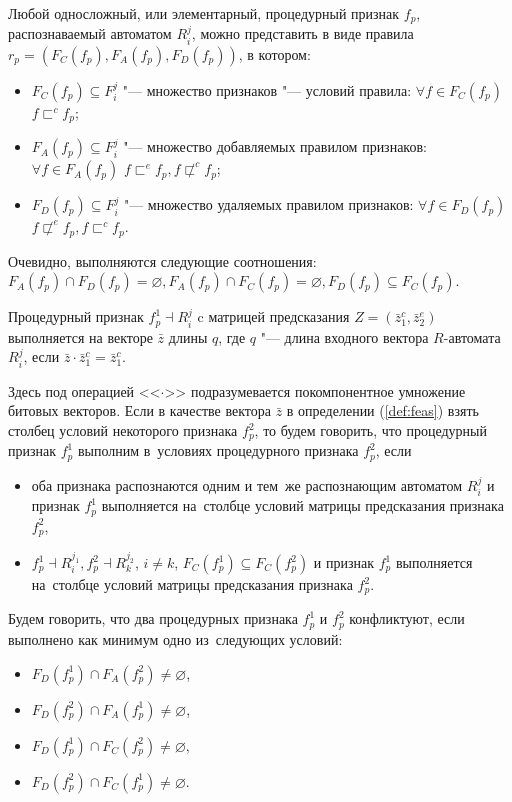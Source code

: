 Любой односложный, или элементарный, процедурный признак $f_p$, распознаваемый автоматом $R_i^j$, можно представить в виде правила $r_p=(F_C(f_p),F_A(f_p),F_D(f_p))$, в котором:
\begin{itemize}
	\item $F_C (f_p )\subseteq F_i^j$ "--- множество признаков "--- условий правила: $\forall f\in F_C(f_p)$ $f\sqsubset^c f_p$;
	\item $F_A(f_p)\subseteq F_i^j$ "--- множество добавляемых правилом признаков: $\forall f\in F_A(f_p)$ $f\sqsubset^e f_p,f\not\sqsubset^c f_p$;
	\item $F_D(f_p)\subseteq F_i^j$ "--- множество удаляемых правилом признаков: $\forall f\in F_D(f_p)$ $f\not\sqsubset^e f_p,f\sqsubset^c f_p$.
\end{itemize}

Очевидно, выполняются следующие соотношения: $F_A(f_p)\cap F_D(f_p)=\varnothing, F_A(f_p)\cap F_C(f_p)=\varnothing, F_D(f_p)\subseteq F_C(f_p)$.

\begin{Def}\label{def:feas}
	Процедурный признак $f_p^1\dashv R_i^j$ c матрицей предсказания $Z=(\bar z_1^c,\bar z_2^e)$ выполняется на векторе $\bar z$ длины $q$, где $q$ "--- длина входного вектора $R$-автомата $R_i^j$, если $\bar z\cdot \bar z_1^c=\bar z_1^c$.
\end{Def}

Здесь под операцией <<$\cdot$>> подразумевается покомпонентное умножение битовых векторов. Если в качестве вектора $\bar z$ в определении (\ref{def:feas}) взять столбец условий некоторого признака $f_p^2$, то будем говорить, что процедурный признак $f_p^1$ выполним в~условиях процедурного признака $f_p^2$, если 
\begin{itemize}
	\item оба признака распознаются одним и тем~же распознающим автоматом $R_i^j$ и признак  $f_p^1$ выполняется на~столбце условий матрицы предсказания признака $f_p^2$,
	\item $f_p^1\dashv R_i^{j_1}, f_p^2\dashv R_k^{j_2}$, $i\not=k$, $F_C(f_p^1 )\subseteq F_C(f_p^2)$ и признак  $f_p^1$ выполняется на~столбце условий матрицы предсказания признака $f_p^2$. 
\end{itemize}

\begin{Def}
	Будем говорить, что два процедурных признака $f_p^1$ и $f_p^2$ конфликтуют, если выполнено как минимум одно из~следующих условий:
	\begin{itemize}
		\item $F_D(f_p^1)\cap F_A(f_p^2)\not=\varnothing$,
		\item $F_D(f_p^2)\cap F_A(f_p^1)\not=\varnothing$,
		\item $F_D(f_p^1)\cap F_C(f_p^2)\not=\varnothing$,
		\item $F_D(f_p^2)\cap F_C(f_p^1)\not=\varnothing$.
	\end{itemize}
\end{Def}


